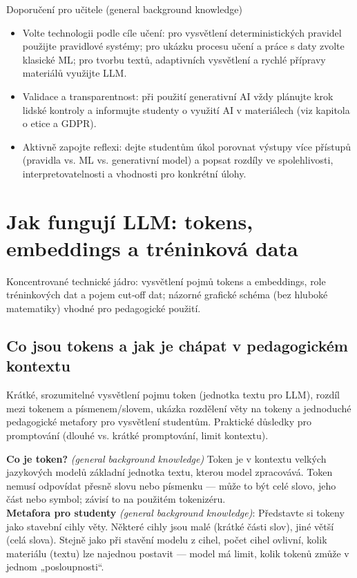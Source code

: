\documentclass{report}%
\begin{document}
Doporučení pro učitele (general background knowledge)
\begin{itemize}
  \item Volte technologii podle cíle učení: pro vysvětlení deterministických pravidel použijte pravidlové systémy; pro ukázku procesu učení a práce s daty zvolte klasické ML; pro tvorbu textů, adaptivních vysvětlení a rychlé přípravy materiálů využijte LLM.
  \item Validace a transparentnost: při použití generativní AI vždy plánujte krok lidské kontroly a informujte studenty o využití AI v materiálech (viz kapitola o etice a GDPR).
  \item Aktivně zapojte reflexi: dejte studentům úkol porovnat výstupy více přístupů (pravidla vs. ML vs. generativní model) a popsat rozdíly ve spolehlivosti, interpretovatelnosti a vhodnosti pro konkrétní úlohy.
\end{itemize}%

%
\section{Jak fungují LLM: tokens, embeddings a tréninková data}%
Koncentrované technické jádro: vysvětlení pojmů tokens a embeddings, role tréninkových dat a pojem cut‑off dat; názorné grafické schéma (bez hluboké matematiky) vhodné pro pedagogické použití.%
\subsection{Co jsou tokens a jak je chápat v pedagogickém kontextu}%
Krátké, srozumitelné vysvětlení pojmu token (jednotka textu pro LLM), rozdíl mezi tokenem a písmenem/slovem, ukázka rozdělení věty na tokeny a jednoduché pedagogické metafory pro vysvětlení studentům. Praktické důsledky pro promptování (dlouhé vs. krátké promptování, limit kontextu).%


%

\noindent\textbf{Co je token?} \emph{(general background knowledge)} Token je v kontextu velkých jazykových modelů základní jednotka textu, kterou model zpracovává. Token nemusí odpovídat přesně slovu nebo písmenku — může to být celé slovo, jeho část nebo symbol; závisí to na použitém tokenizéru.\\

\noindent\textbf{Metafora pro studenty} \emph{(general background knowledge)}: Představte si tokeny jako stavební cihly věty. Některé cihly jsou malé (krátké části slov), jiné větší (celá slova). Stejně jako při stavění modelu z cihel, počet cihel ovlivní, kolik materiálu (textu) lze najednou postavit — model má limit, kolik tokenů zmůže v jednom „posloupnosti“.\\
\end{document}
